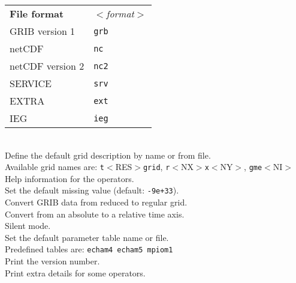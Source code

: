 \begin{tabbing}
         \> \parbox[r]{3in}{
              \vspace*{1mm}
              \hspace*{0cm}\begin{tabular}{|l|l|}
              \hline
              \rowcolor[gray]{.9}
              {\bf File format} & \sl $<$format$>$ \\
               GRIB version 1   & {\tt grb} \\
               netCDF           & {\tt nc}  \\
               netCDF version 2 & {\tt nc2} \\
               SERVICE          & {\tt srv} \\
               EXTRA            & {\tt ext} \\
               IEG              & {\tt ieg} \\
              \hline
              \end{tabular}
              \vspace*{1mm}
            } \\
         \> Define the default grid description by name or from file. \\
         \> Available grid names are: {\tt t}$<$RES$>${\tt grid}, {\tt r}$<$NX$>${\tt x}$<$NY$>$, {\tt gme}$<$NI$>$ \\
         \> Help information for the operators. \\
         \> Set the default missing value (default: {\tt-9e+33}). \\
         \> Convert GRIB data from reduced to regular grid. \\
         \> Convert from an absolute to a relative time axis. \\
         \> Silent mode. \\
         \> Set the default parameter table name or file.\\
         \> Predefined tables are:  {\tt echam4 echam5 mpiom1}\\
         \> Print the version number. \\
         \> Print extra details for some operators. \\
\end{tabbing}


